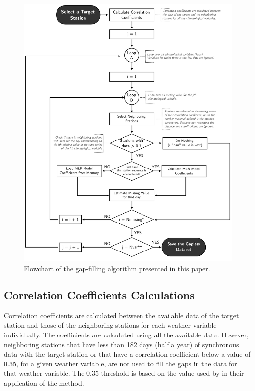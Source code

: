 \documentclass[TechnicalNoteMeteo.tex]{subfiles}
\begin{document}
\begin{figure}[!p]
    \centering
    \includegraphics[width=\textwidth]{img/Flowchart-filling_missing_weather.pdf} 
    \caption{Flowchart of the gap-filling algorithm presented in this paper.}
    \label{fig:fillworker_flowchart}
\end{figure}

\subsection{Correlation Coefficients Calculations}

Correlation coefficients are calculated between the available data of the target station and those of the neighboring stations for each weather variable individually. The coefficients are calculated using all the available data. However, neighboring stations that have less than 182 days (half a year) of synchronous data with the target station or that have a correlation coefficient below a value of 0.35, for a given weather variable, are not used to fill the gaps in the data for that weather variable. The 0.35 threshold is based on the value used by \cite{eischeid_creating_2000} in their application of the method. 
\end{document}
